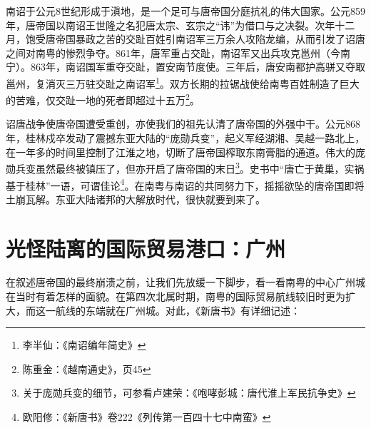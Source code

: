 南诏于公元8世纪形成于滇地，是一个足可与唐帝国分庭抗礼的伟大国家。公元859年，唐帝国以南诏王世隆之名犯唐太宗、玄宗之“讳”为借口与之决裂。次年十二月，饱受唐帝国暴政之苦的交趾百姓引南诏军三万余人攻陷龙编，从而引发了诏唐之间对南粤的惨烈争夺。861年，唐军重占交趾，南诏军又出兵攻克邕州（今南宁）。863年，南诏国军重夺交趾，置安南节度使。三年后，唐安南都护高骈又夺取邕州，复消灭三万驻交趾之南诏军\footnote{李半仙：《南诏编年简史》}。双方长期的拉锯战使给南粤百姓制造了巨大的苦难，仅交趾一地的死者即超过十五万\footnote{陈重金：《越南通史》，页45}。

诏唐战争使唐帝国遭受重创，亦使我们的祖先认清了唐帝国的外强中干。公元868年，桂林戍卒发动了震撼东亚大陆的“庞勋兵变”，起义军经湖湘、吴越一路北上，在一年多的时间里控制了江淮之地，切断了唐帝国榨取东南膏脂的通道。伟大的庞勋兵变虽然最终被镇压了，但亦开启了唐帝国的末日\footnote{关于庞勋兵变的细节，可参看卢建荣：《咆哮彭城：唐代淮上军民抗争史》}。史书中“唐亡于黄巢，实祸基于桂林”一语，可谓佳论\footnote{欧阳修：《新唐书》卷222《列传第一百四十七中南蛮》}。在南粤与南诏的共同努力下，摇摇欲坠的唐帝国即将土崩瓦解。东亚大陆诸邦的大解放时代，很快就要到来了。

\section{光怪陆离的国际贸易港口：广州}

在叙述唐帝国的最终崩溃之前，让我们先放缓一下脚步，看一看南粤的中心广州城在当时有着怎样的面貌。在第四次北属时期，南粤的国际贸易航线较旧时更为扩大，而这一航线的东端就在广州城。对此，《新唐书》有详细记述：


